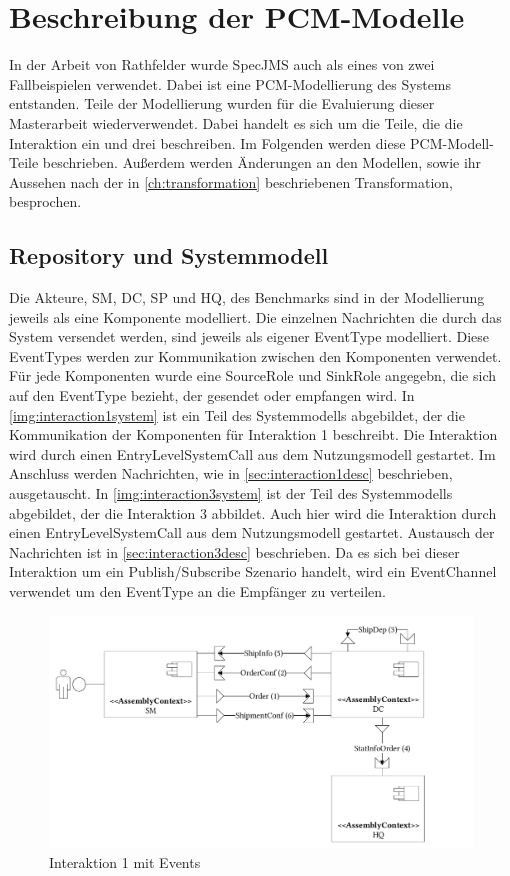 \section{Beschreibung der PCM-Modelle}
In der Arbeit von Rathfelder \cite{Rathfelder2013} wurde SpecJMS auch als eines von zwei Fallbeispielen verwendet. Dabei ist eine PCM-Modellierung des Systems entstanden. Teile der Modellierung wurden für die Evaluierung dieser Masterarbeit wiederverwendet. Dabei handelt es sich um die Teile, die die Interaktion ein und drei beschreiben. Im Folgenden werden diese PCM-Modell-Teile beschrieben. Außerdem werden Änderungen an den Modellen, sowie ihr Aussehen nach der in \autoref{ch:transformation} beschriebenen Transformation, besprochen. 

\subsection{Repository und Systemmodell}
Die Akteure, SM, DC, SP und HQ, des Benchmarks sind in der Modellierung jeweils als eine Komponente modelliert. Die einzelnen Nachrichten die durch das System versendet werden, sind jeweils als eigener EventType modelliert. Diese EventTypes werden zur Kommunikation zwischen den Komponenten verwendet. Für jede Komponenten wurde eine SourceRole und SinkRole angegebn, die sich auf den EventType bezieht, der gesendet oder empfangen wird. In \autoref{img:interaction1system} ist ein Teil des Systemmodells abgebildet, der die Kommunikation der Komponenten für Interaktion 1 beschreibt. Die Interaktion wird durch einen EntryLevelSystemCall aus dem Nutzungsmodell gestartet. Im Anschluss werden Nachrichten, wie in \autoref{sec:interaction1desc} beschrieben, ausgetauscht. In \autoref{img:interaction3system} ist der Teil des Systemmodells abgebildet, der die Interaktion 3 abbildet. Auch hier wird die Interaktion durch einen EntryLevelSystemCall aus dem Nutzungsmodell gestartet. Austausch der Nachrichten ist in \autoref{sec:interaction3desc} beschrieben. Da es sich bei dieser Interaktion um ein Publish/Subscribe Szenario handelt, wird ein EventChannel verwendet um den EventType an die Empfänger zu verteilen.

\begin{figure}
\center
  \includegraphics[width=1\textwidth]{images/evaluation/specjms/evaluationInteraktion1events.pdf}
  \caption{Interaktion 1 mit Events}
  \label{img:interaction1system}
\end{figure}

